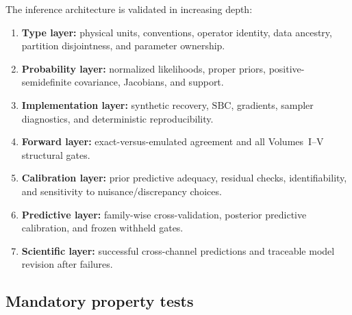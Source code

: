 \documentclass[11pt]{article}
\newcommand{\SBC}{\ensuremath{\mathrm{SBC}}}
\begin{document}
The inference architecture is validated in increasing depth:
\begin{enumerate}
\item \textbf{Type layer:} physical units, conventions, operator identity,
data ancestry, partition disjointness, and parameter ownership.
\item \textbf{Probability layer:} normalized likelihoods, proper priors,
positive-semidefinite covariance, Jacobians, and support.
\item \textbf{Implementation layer:} synthetic recovery, \SBC, gradients,
sampler diagnostics, and deterministic reproducibility.
\item \textbf{Forward layer:} exact-versus-emulated agreement and all
Volumes~I--V structural gates.
\item \textbf{Calibration layer:} prior predictive adequacy, residual checks,
identifiability, and sensitivity to nuisance/discrepancy choices.
\item \textbf{Predictive layer:} family-wise cross-validation, posterior
predictive calibration, and frozen withheld gates.
\item \textbf{Scientific layer:} successful cross-channel predictions and
traceable model revision after failures.
\end{enumerate}

\subsection{Mandatory property tests}
\end{document}
